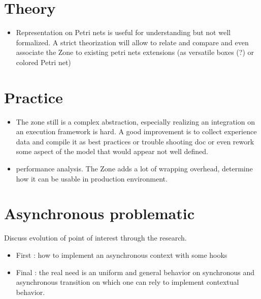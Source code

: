 \section{Theory}

\begin{itemize}
\item Representation on Petri nets is useful for understanding but not well formalized. A strict theorization will allow to relate and compare and even associate the Zone to existing petri nets extensions (as versatile boxes (?) or colored Petri net)
\end{itemize}

\section{Practice}

\begin{itemize}
\item The zone still is a complex abstraction, especially realizing an integration on an execution framework is hard. A good improvement is to collect experience data and compile it as best practices or trouble shooting doc or even rework some aspect of the model that would appear not well defined.
\item performance analysis. The Zone adds a lot of wrapping overhead, determine how it can be usable in production environment.
\end{itemize}


\section{Asynchronous problematic}

Discuss evolution of point of interest through the research.

\begin{itemize}
\item First : how to implement an asynchronous context with some hooks
\item Final : the real need is an uniform and general behavior on synchronous and asynchronous transition on which one can rely to implement contextual behavior.
\end{itemize}